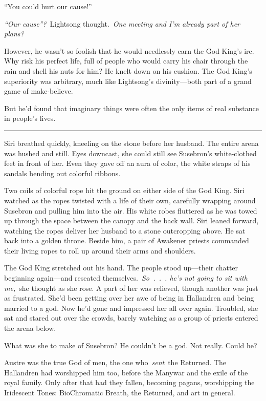“You could hurt our cause!”

\textit{“Our cause”?}~Lightsong thought.~\textit{One meeting and I’m already part of her plans?}

However, he wasn’t so foolish that he would needlessly earn the God King’s ire. Why risk his perfect life, full of people who would carry his chair through the rain and shell his nuts for him? He knelt down on his cushion. The God King’s superiority was arbitrary, much like Lightsong’s divinity—both part of a grand game of make-believe.

But he’d found that imaginary things were often the only items of real substance in people’s lives.

\bigskip \hrule \bigskip

Siri breathed quickly, kneeling on the stone before her husband. The entire arena was hushed and still. Eyes downcast, she could still see Susebron’s white-clothed feet in front of her. Even they gave off an aura of color, the white straps of his sandals bending out colorful ribbons.

Two coils of colorful rope hit the ground on either side of the God King. Siri watched as the ropes twisted with a life of their own, carefully wrapping around Susebron and pulling him into the air. His white robes fluttered as he was towed up through the space between the canopy and the back wall. Siri leaned forward, watching the ropes deliver her husband to a stone outcropping above. He sat back into a golden throne. Beside him, a pair of Awakener priests commanded their living ropes to roll up around their arms and shoulders.

The God King stretched out his hand. The people stood up—their chatter beginning again—and reseated themselves.~\textit{So~.~.~. he’s not going to sit with me,}~she thought as she rose. A part of her was relieved, though another was just as frustrated. She’d been getting over her awe of being in Hallandren and being married to a god. Now he’d gone and impressed her all over again. Troubled, she sat and stared out over the crowds, barely watching as a group of priests entered the arena below.

What was she to make of Susebron? He couldn’t be a god. Not really. Could he?

Austre was the true God of men, the one who~\textit{sent}~the Returned. The Hallandren had worshipped him too, before the Manywar and the exile of the royal family. Only after that had they fallen, becoming pagans, worshipping the Iridescent Tones: BioChromatic Breath, the Returned, and art in general.

